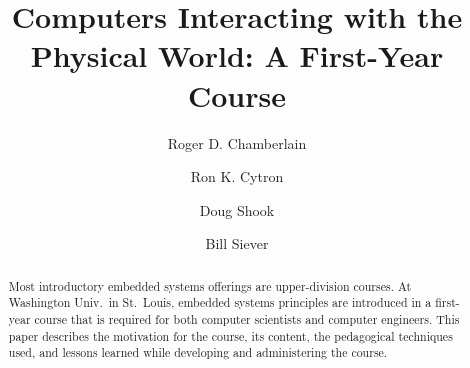 \documentclass[runningheads]{llncs}
\begin{document}
%
\title{Computers Interacting with the Physical World: A First-Year Course}
%
%
\author{Roger D. Chamberlain%
\and
Ron K. Cytron%
\and
Doug Shook%
\and
Bill Siever%
}
%
%
%

\maketitle              %
%
\begin{abstract}
Most introductory embedded systems offerings are upper-division courses.
At Washington Univ.~in St.~Louis,
embedded systems principles are introduced in a first-year course that
is required for both computer scientists and computer engineers.
This paper describes the motivation for the course, its content,
the pedagogical techniques used, and lessons learned while developing
and administering the course.

\end{abstract}
%
%
%










%
%
%


%
\end{document}
